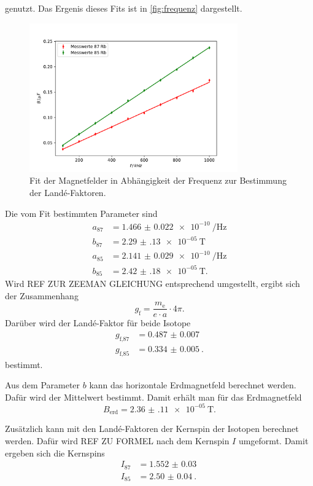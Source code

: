 genutzt.
Das Ergenis dieses Fits ist in \autoref{fig:frequenz} dargestellt.
\begin{figure}
    \centering
    \includegraphics[width=0.8\textwidth]{plots/frequenz.pdf}
    \caption{Fit der Magnetfelder in Abhängigkeit der Frequenz zur Bestimmung der Landé-Faktoren.}
    \label{fig:frequenz}
\end{figure}
Die vom Fit bestimmten Parameter sind 
\begin{align*}
    a_\text{87} &= \qty{1.466(22)e-10}{\per\hertz} \\
    b_\text{87} &= \qty{2.29(13)e-05}{\tesla} \\
    a_\text{85} &= \qty{2.141(29)e-10}{\per\hertz} \\
    b_\text{85} &= \qty{2.42(18)e-05}{\tesla}.
\end{align*}
Wird REF ZUR ZEEMAN GLEICHUNG entsprechend umgestellt, ergibt sich der Zusammenhang
\begin{equation}
    g_\text{f} = \frac{m_\text{e}}{e \cdot a} \cdot 4\pi.
\end{equation}
Darüber wird der Landé-Faktor für beide Isotope 
\begin{align*}
    g_\text{f,87} &= \qty{0.487(7)}{} \\
    g_\text{f,85} &= \qty{0.334(5)}{}.
\end{align*}
bestimmt.

Aus dem Parameter $b$ kann das horizontale Erdmagnetfeld berechnet werden.
Dafür wird der Mittelwert bestimmt.
Damit erhält man für das Erdmagnetfeld
\begin{equation*}
    B_\text{erd} = \qty{2.36(11)e-05}{\tesla}.
\end{equation*}

Zusätzlich kann mit den Landé-Faktoren der Kernspin der Isotopen berechnet werden.
Dafür wird REF ZU FORMEL nach dem Kernspin $I$ umgeformt.
Damit ergeben sich die Kernspins 
\begin{align*}
    I_\text{87} &= \qty{1.552(30)}{} \\
    I_\text{85} &= \qty{2.50(4)}{}.
\end{align*}

